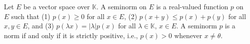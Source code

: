 Let $E$ be a vector space over $\mathbb{K}$. A seminorm on $E$ is a real-valued function $p$ on $E$ such that (1) $p(x) \geq 0$ for all $x \in E$, (2) $p(x + y) \leq p(x) + p(y)$ for all $x, y \in E$, and (3) $p(\lambda x) = |\lambda| p(x)$ for all $\lambda \in \mathbb{K}$, $x \in E$. A seminorm $p$ is a norm if and only if it is strictly positive, i.e., $p(x) > 0$ whenever $x \neq \theta$.